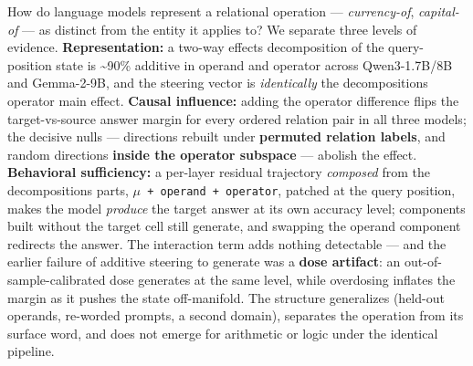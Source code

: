 How do language models represent a relational operation ---
\emph{currency-of}, \emph{capital-of} --- as distinct from the entity it
applies to? We separate three levels of evidence.
\textbf{Representation:} a two-way effects decomposition of the
query-position state is \textasciitilde90\% additive in operand and
operator across Qwen3-1.7B/8B and Gemma-2-9B, and the steering vector is
\emph{identically} the decomposition\textquotesingle s operator main
effect. \textbf{Causal influence:} adding the operator difference flips
the target-vs-source answer margin for every ordered relation pair in
all three models; the decisive nulls --- directions rebuilt under
\textbf{permuted relation labels}, and random directions \textbf{inside
the operator subspace} --- abolish the effect. \textbf{Behavioral
sufficiency:} a per-layer residual trajectory \emph{composed} from the
decomposition\textquotesingle s parts,
\texttt{\ensuremath{\mu}\ +\ operand\ +\ operator}, patched at the query position,
makes the model \emph{produce} the target answer at its own accuracy
level; components built without the target cell still generate, and
swapping the operand component redirects the answer. The interaction
term adds nothing detectable --- and the earlier failure of additive
steering to generate was a \textbf{dose artifact}: an
out-of-sample-calibrated dose generates at the same level, while
overdosing inflates the margin as it pushes the state off-manifold. The
structure generalizes (held-out operands, re-worded prompts, a second
domain), separates the operation from its surface word, and does not
emerge for arithmetic or logic under the identical pipeline.
